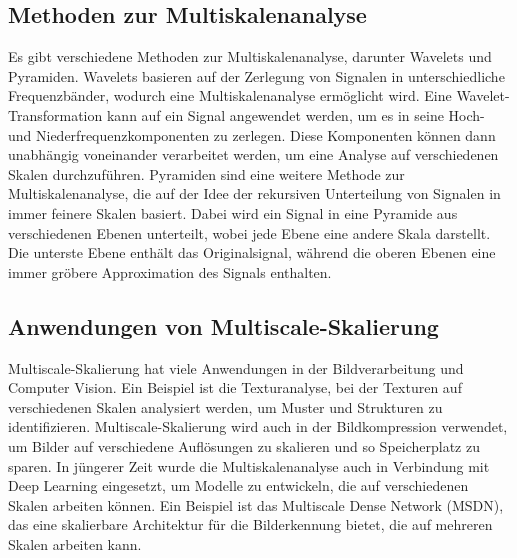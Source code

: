     \subsection{Methoden zur Multiskalenanalyse}
        Es gibt verschiedene Methoden zur Multiskalenanalyse, darunter Wavelets und Pyramiden.      
        Wavelets basieren auf der Zerlegung von Signalen in unterschiedliche Frequenzbänder, wodurch eine Multiskalenanalyse ermöglicht wird.      
        Eine Wavelet-Transformation kann auf ein Signal angewendet werden, um es in seine Hoch- und Niederfrequenzkomponenten zu zerlegen.      
        Diese Komponenten können dann unabhängig voneinander verarbeitet werden, um eine Analyse auf verschiedenen Skalen durchzuführen.
        Pyramiden sind eine weitere Methode zur Multiskalenanalyse, die auf der Idee der rekursiven Unterteilung von Signalen in immer feinere Skalen basiert.      Dabei wird ein Signal in eine Pyramide aus verschiedenen Ebenen unterteilt, wobei jede Ebene eine andere Skala darstellt.      
        Die unterste Ebene enthält das Originalsignal, während die oberen Ebenen eine immer gröbere Approximation des Signals enthalten.
    
    \subsection{Anwendungen von Multiscale-Skalierung}
        Multiscale-Skalierung hat viele Anwendungen in der Bildverarbeitung und Computer Vision.      
        Ein Beispiel ist die Texturanalyse, bei der Texturen auf verschiedenen Skalen analysiert werden, um Muster und Strukturen zu identifizieren.      
        Multiscale-Skalierung wird auch in der Bildkompression verwendet, um Bilder auf verschiedene Auflösungen zu skalieren und so Speicherplatz zu sparen.
        In jüngerer Zeit wurde die Multiskalenanalyse auch in Verbindung mit Deep Learning eingesetzt, um Modelle zu entwickeln, die auf verschiedenen Skalen arbeiten können.      
        Ein Beispiel ist das Multiscale Dense Network (MSDN), das eine skalierbare Architektur für die Bilderkennung bietet, die auf mehreren Skalen arbeiten kann.
    
